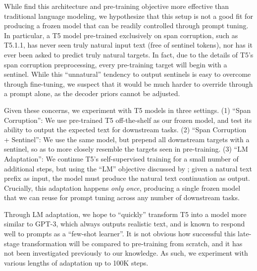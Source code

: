 \documentclass[11pt]{article}
\begin{document}
While \citet{raffel_2020_t5} find this architecture and pre-training objective more effective than traditional language modeling, we hypothesize that this setup is not a good fit for producing a frozen model that can be readily controlled through prompt tuning. In particular, a T5 model pre-trained exclusively on span corruption, such as T5.1.1, has never seen truly natural input text (free of sentinel tokens), nor has it ever been asked to predict truly natural targets. In fact, due to the details of T5's span corruption preprocessing, every pre-training target will begin with a sentinel. While this ``unnatural'' tendency to output sentinels is easy to overcome through fine-tuning, we suspect that it would be much harder to override through a prompt alone, as the decoder priors cannot be adjusted.

Given these concerns, we experiment with T5 models in three settings. (1) ``Span Corruption'': We use pre-trained T5 off-the-shelf as our frozen model, and test its ability to output the expected text for downstream tasks. (2) ``Span Corruption + Sentinel'': We use the same model, but prepend all downstream targets with a sentinel, so as to more closely resemble the targets seen in pre-training. (3) ``LM Adaptation'': We continue T5's self-supervised training for a small number of additional steps, but using the ``LM'' objective discussed by \citet{raffel_2020_t5}; given a natural text prefix as input, the model must produce the natural text continuation as output. Crucially, this adaptation happens \emph{only once}, producing a single frozen model that we can reuse for prompt tuning across any number of downstream tasks.

Through LM adaptation, we hope to ``quickly'' transform T5 into a model more similar to \mbox{GPT-3}, which always outputs realistic text, and is known to respond well to prompts as a ``few-shot learner''. It is not obvious how successful this late-stage transformation will be compared to pre-training from scratch, and it has not been investigated previously to our knowledge. As such, we experiment with various lengths of adaptation up to 100K steps.
\end{document}
